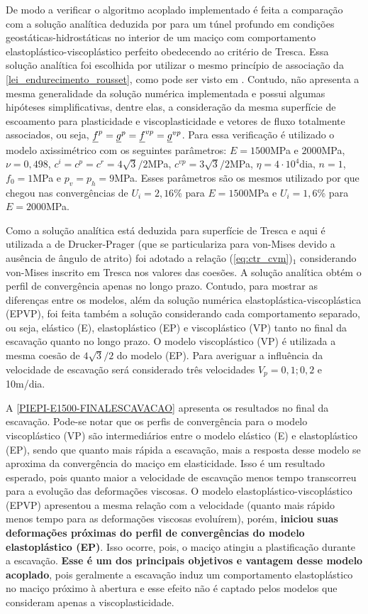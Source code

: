 De modo a verificar o algoritmo acoplado implementado é feita a comparação com a solução analítica deduzida por  para um túnel profundo em condições geostáticas-hidrostáticas no interior de um maciço com comportamento elastoplástico-viscoplástico perfeito obedecendo ao critério de Tresca. Essa solução analítica foi escolhida por utilizar o mesmo princípio de associação da \autoref{lei_endurecimento_rousset}, como pode ser visto em . Contudo, não apresenta a mesma generalidade da solução numérica implementada e possui algumas hipóteses simplificativas, dentre elas, a consideração da mesma superfície de escoamento para plasticidade e viscoplasticidade e vetores de fluxo totalmente associados, ou seja, $\underline f^p = \underline{g}^{p} = \underline f^{vp} = \underline{g}^{vp}$. Para essa verificação é utilizado o modelo axissimétrico com os seguintes parâmetros: $E=1500$MPa e $2000$MPa, $\nu=0,498$, $c^i=c^p=c^r =4\sqrt{3}/2$MPa, $c^{vp}=3\sqrt{3}/2$MPa, $\eta = 4 \cdot 10^4$dia, $n=1$, $f_0=1$MPa e $p_v=p_h=9$MPa. Esses parâmetros são os mesmos utilizado por  que chegou nas convergências de $U_i=2,16$\% para $E=1500$MPa e $U_i=1,6$\% para $E=2000$MPa.

Como a solução analítica está deduzida para superfície de Tresca e aqui é utilizada a de Drucker-Prager (que se particulariza para von-Mises devido a ausência de ângulo de atrito) foi adotado a relação (\ref{eq:ctr_cvm})$_1$ considerando von-Mises inscrito em Tresca nos valores das coesões. A solução analítica obtém o perfil de convergência apenas no longo prazo. Contudo, para mostrar as diferenças entre os modelos, além da solução numérica elastoplástica-viscoplástica (EPVP), foi feita também a solução considerando cada comportamento separado, ou seja, elástico (E), elastoplástico (EP) e viscoplástico (VP) tanto no final da escavação quanto no longo prazo. O modelo viscoplástico (VP) é utilizada a mesma coesão de $4\sqrt{3}/2$ do modelo (EP). Para averiguar a influência da velocidade de escavação será considerado três velocidades $V_p=0,1; 0,2$ e 10m/dia.

A \autoref{PIEPI-E1500-FINALESCAVACAO} apresenta os resultados no final da escavação. Pode-se notar que os perfis de convergência para o modelo viscoplástico (VP) são intermediários entre o modelo elástico (E) e elastoplástico (EP), sendo que quanto mais rápida a escavação, mais a resposta desse modelo se  aproxima da convergência do maciço em elasticidade. Isso é um resultado esperado, pois quanto maior a velocidade de escavação menos tempo transcorreu para a evolução das deformações viscosas. O modelo elastoplástico-viscoplástico (EPVP) apresentou a mesma relação com a velocidade (quanto mais rápido menos tempo para as deformações viscosas evoluírem), porém, \textbf{iniciou suas deformações próximas do perfil de convergências do modelo elastoplástico (EP)}. Isso ocorre, pois, o maciço atingiu a plastificação durante a escavação. \textbf{Esse é um dos principais objetivos e vantagem desse modelo acoplado}, pois geralmente a escavação induz um comportamento elastoplástico no maciço próximo à abertura e esse efeito não é captado pelos modelos que consideram apenas a viscoplasticidade.

